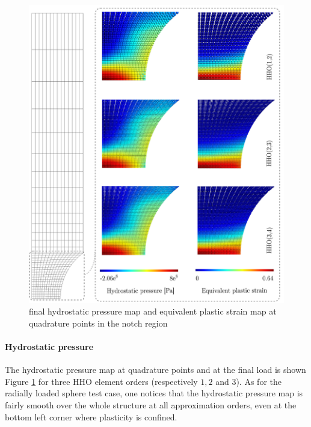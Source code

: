 \begin{figure}[H]
    \centering
    \includegraphics[width=12.cm]{../chapter_002_hho_mechanics/drawings/ssna_res.png}
    \caption{
        final hydrostatic pressure map and equivalent plastic strain map at quadrature points in the notch region
    }
    \label{fig_ssna_res}
\end{figure}

\paragraph{Hydrostatic pressure}

The hydrostatic pressure map at quadrature points and at the final load is shown Figure \ref{fig_ssna_res} for three HHO element orders (respectively $1, 2$ and $3$).
As for the radially loaded sphere test case, one notices that the hydrostatic pressure map is
fairly smooth over the whole structure at all approximation orders, even at the bottom left corner where plasticity is confined.

